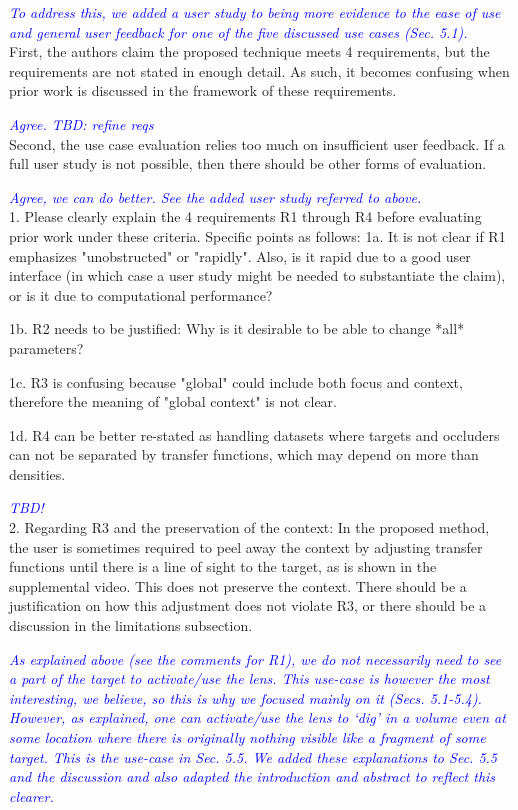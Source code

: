 \documentclass[a4paper,10pt]{article}
\newcommand{\rr}[1]{\emph{\textcolor{blue}{#1}}}
\begin{document}
    \rr{To address this, we added a user study to being more evidence to the ease of use and general user feedback for one of the five discussed
    use cases (Sec. 5.1).}\\

    First, the authors claim the proposed technique meets 4 requirements, but the requirements
    are not stated in enough detail. As such, it becomes confusing when prior work is
    discussed in the framework of these requirements. 
    
    \rr{Agree. TBD: refine reqs}\\
    
    Second, the use case evaluation relies too much on insufficient user feedback. If a full user study is not
    possible, then there should be other forms of evaluation. 
    
    \rr{Agree, we can do better. See the added user study referred to above.}\\
    
    1. Please clearly explain the 4 requirements R1 through R4 before evaluating prior
    work under these criteria. Specific points as follows:
    1a. It is not clear if R1 emphasizes "unobstructed" or "rapidly". Also, is it
    rapid due to a good user interface (in which case a user study might be needed to
    substantiate the claim), or is it due to computational performance?

    1b. R2 needs to be justified: Why is it desirable to be able to change *all*
    parameters?

    1c. R3 is confusing because "global" could include both focus and context,
    therefore the meaning of "global context" is not clear.

    1d. R4 can be better re-stated as handling datasets where targets and occluders
    can not be separated by transfer functions, which may depend on more than
    densities.

    \rr{TBD!}\\

    2. Regarding R3 and the preservation of the context: In the proposed method, the
    user is sometimes required to peel away the context by adjusting transfer
    functions until there is a line of sight to the target, as is shown in the
    supplemental video. This does not preserve the context. There should be a
    justification on how this adjustment does not violate R3, or there should be a
    discussion in the limitations subsection.
    
    \rr{As explained above (see the comments for R1), we do not necessarily need to see a part of the target to activate/use the lens. This use-case is however the most interesting, we believe, so this is why we focused mainly on it (Secs. 5.1-5.4). However, as explained, one can activate/use the lens to `dig' in a volume even at some location where there is originally nothing visible like a fragment of some target. This is the use-case in Sec. 5.5. We added these explanations to Sec. 5.5 and the discussion and also adapted the introduction and abstract to reflect this clearer.}\\
    
\end{document}
